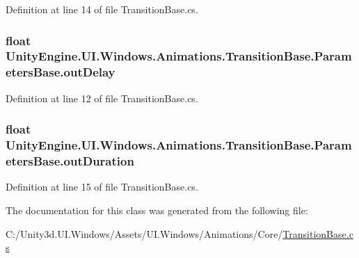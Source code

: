 Definition at line 14 of file Transition\+Base.\+cs.

\hypertarget{class_unity_engine_1_1_u_i_1_1_windows_1_1_animations_1_1_transition_base_1_1_parameters_base_ad3bb413f5cb65249c04b9bcd8b1d5c45}{}
\subsubsection[{out\+Delay}]{\setlength{\rightskip}{0pt plus 5cm}float Unity\+Engine.\+U\+I.\+Windows.\+Animations.\+Transition\+Base.\+Parameters\+Base.\+out\+Delay}\label{class_unity_engine_1_1_u_i_1_1_windows_1_1_animations_1_1_transition_base_1_1_parameters_base_ad3bb413f5cb65249c04b9bcd8b1d5c45}


Definition at line 12 of file Transition\+Base.\+cs.

\hypertarget{class_unity_engine_1_1_u_i_1_1_windows_1_1_animations_1_1_transition_base_1_1_parameters_base_a817dedbc9b3c5fab4552ff012ee6c611}{}
\subsubsection[{out\+Duration}]{\setlength{\rightskip}{0pt plus 5cm}float Unity\+Engine.\+U\+I.\+Windows.\+Animations.\+Transition\+Base.\+Parameters\+Base.\+out\+Duration}\label{class_unity_engine_1_1_u_i_1_1_windows_1_1_animations_1_1_transition_base_1_1_parameters_base_a817dedbc9b3c5fab4552ff012ee6c611}


Definition at line 15 of file Transition\+Base.\+cs.



The documentation for this class was generated from the following file\+:\begin{DoxyCompactItemize}
\item 
C\+:/\+Unity3d.\+U\+I.\+Windows/\+Assets/\+U\+I.\+Windows/\+Animations/\+Core/\hyperlink{_transition_base_8cs}{Transition\+Base.\+cs}\end{DoxyCompactItemize}
